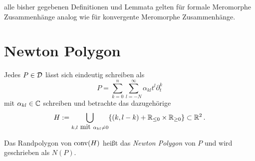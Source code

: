 \begin{bem}
  alle bisher gegebenen Definitionen und Lemmata gelten für formale Meromorphe
  Zusammenhänge analog wie für konvergente Meromorphe Zusammenhänge.
\end{bem}

\section{Newton Polygon} %

Jedes $P\in \mathcal{D}$ lässt sich eindeutig schreiben als
\[ P=\sum^{n}_{k=0}{\sum^{\infty}_{l=-N}{\alpha_{kl}t^l\partial_t^k}} \]
mit $\alpha_{kl}\in\mathbb{C}$ schreiben und betrachte das dazugehörige
\[ H:=\underset{k,l\mbox{ mit }\alpha_{kl}\neq0}{\bigcup}\{ (k,l-k) +
  \mathbb{R}_{\leq 0}\times \mathbb{R}_{\geq 0} \}\subset \mathbb{R}^2 \,. \]

\begin{defn} %
  Das Randpolygon von $\operatorname{conv}(H)$ heißt das \emph{Newton Polygon} von $P$ und
  wird geschrieben als $N(P)$.
\end{defn}

